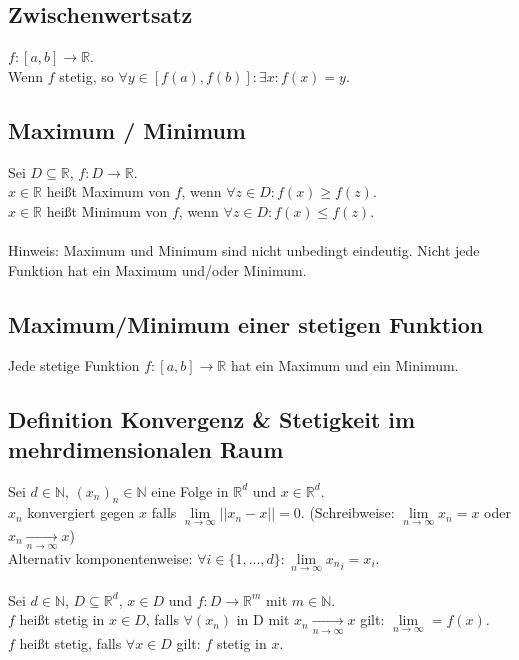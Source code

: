 \documentclass[halfparscip]{scrartcl}
\newcounter{subsection2}
\begin{document}
\subsection{Zwischenwertsatz}
$f : [a,b] \rightarrow \mathbb{R}$.\\
Wenn $f$ stetig, so $\forall y\in[f(a), f(b)]: \exists x : f(x) = y$.

\subsection{Maximum / Minimum}
Sei $D \subseteq \mathbb{R}$, $f : D \rightarrow \mathbb{R}$.\\
$x \in \mathbb{R}$ heißt Maximum von $f$, wenn $\forall z \in D: f(x) \geq f(z)$.\\
$x \in \mathbb{R}$ heißt Minimum von $f$, wenn $\forall z \in D: f(x) \leq f(z)$.\\\\
Hinweis: Maximum und Minimum sind nicht unbedingt eindeutig. Nicht jede Funktion hat ein Maximum und/oder Minimum.

\subsection{Maximum/Minimum einer stetigen Funktion}
Jede stetige Funktion $f: [a, b] \rightarrow \mathbb{R}$ hat ein Maximum und ein Minimum.

\subsection{Definition Konvergenz \& Stetigkeit im mehrdimensionalen Raum}
Sei $d \in \mathbb{N}$, $(x_n)_n \in \mathbb{N}$ eine Folge in $\mathbb{R}^d$ und $x \in \mathbb{R}^d$.\\
$x_n$ konvergiert gegen $x$ falls $\lim\limits_{n \rightarrow \infty} \vert\vert x_n - x\vert\vert = 0$. (Schreibweise: $\lim\limits_{n \rightarrow \infty} x_n = x$ 
oder \mbox{$x_n \xrightarrow[n \rightarrow \infty]{} x$})\\
Alternativ komponentenweise: $\forall i \in \{1,...,d\}: \lim\limits_{n \rightarrow \infty} {x_n}_i = x_i$.\\\\
Sei $d \in \mathbb{N}$, $D \subseteq \mathbb{R}^d$, $x \in D$ und $f : D \rightarrow \mathbb{R}^m$ mit $m \in \mathbb{N}$.\\
$f$ heißt stetig in $x \in D$, falls $\forall (x_n)$ in D mit $x_n \xrightarrow[n \rightarrow \infty]{} x$ gilt: $\lim\limits_{n \rightarrow \infty} = f(x)$.\\
$f$ heißt stetig, falls $\forall x \in D$ gilt: $f$ stetig in $x$.
\end{document}
